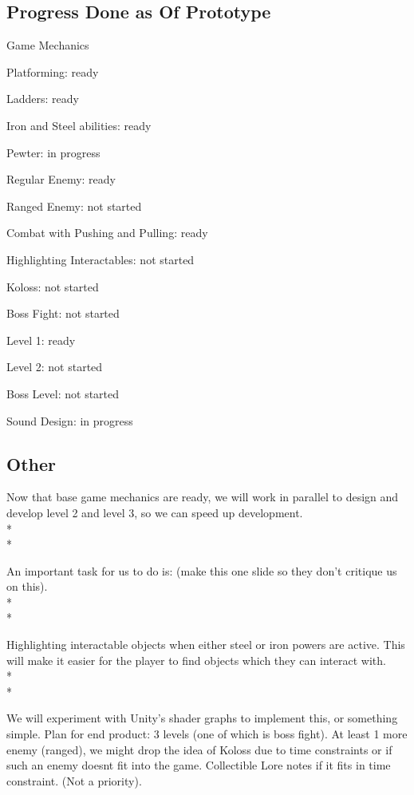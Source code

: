\documentclass{article}
\begin{document}
\subsection{Progress Done as Of Prototype}
Game Mechanics

\begin{description}
\item Platforming: ready
\item Ladders: ready
\item Iron and Steel abilities: ready
\item Pewter: in progress
\item Regular Enemy: ready
\item Ranged Enemy: not started
\item Combat with Pushing and Pulling: ready
\item Highlighting Interactables: not started
\item Koloss: not started
\item Boss Fight: not started
\item Level 1: ready
\item Level 2: not started
\item Boss Level: not started
\item Sound Design: in progress
\end{description}

\subsection{Other}
Now that base game mechanics are ready, we will work in parallel to design and develop level 2 and level 3, so we can speed up development.\\*\\*

An important task for us to do is: (make this one slide so they don't critique us on this).\\*\\*

Highlighting interactable objects when either steel or iron powers are active. This will make it easier for the player to find objects which they can interact with.\\*\\*

We will experiment with Unity’s shader graphs to implement this, or something simple. Plan for end product: 3 levels (one of which is boss fight). At least 1 more enemy (ranged), we might drop the idea of Koloss due to time constraints or if such an enemy doesnt fit into the game. Collectible Lore notes if it fits in time constraint. (Not a priority).
\end{document}

